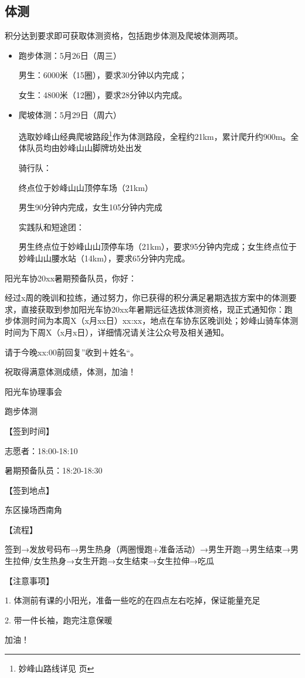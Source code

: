 \documentclass{ctexbook}
\begin{document}
\subsection{体测}

积分达到要求即可获取体测资格，包括跑步体测及爬坡体测两项。
\begin{itemize}

\item 跑步体测：5月26日（周三）

男生：6000米（15圈），要求30分钟以内完成；

女生：4800米（12圈），要求28分钟以内完成。

\item 爬坡体测：5月29日（周六）

选取妙峰山经典爬坡路段\footnote{妙峰山路线详见 \pageref{subsec:妙峰山} 页}作为体测路段，全程约21km，累计爬升约900m。全体队员均由妙峰山山脚牌坊处出发

骑行队：

终点位于妙峰山山顶停车场（21km）

男生90分钟内完成，女生105分钟内完成

实践队和短途团：

男生终点位于妙峰山山顶停车场（21km），要求95分钟内完成；女生终点位于妙峰山山腰水站（14km），要求65分钟内完成。

\end{itemize}
\begin{tcolorbox}[title=暑期跑步体测短信模板]
    
阳光车协20xx暑期预备队员，你好：

经过x周的晚训和拉练，通过努力，你已获得的积分满足暑期选拔方案中的体测要求，直接获取到参加阳光车协20xx年暑期远征选拔体测资格，现正式通知你：跑步体测时间为本周X（x月xx日）xx:xx，地点在车协东区晚训处；妙峰山骑车体测时间为下周X（x月x日），详细情况请关注公众号及相关通知。

请于今晚xx:00前回复''收到＋姓名``。

祝取得满意体测成绩，体测，加油！

阳光车协理事会
\end{tcolorbox}
\begin{tcolorbox}

跑步体测

【签到时间】

志愿者：18:00-18:10

暑期预备队员：18:20-18:30

【签到地点】

东区操场西南角

【流程】

签到→发放号码布→男生热身（两圈慢跑+准备活动）→男生开跑→男生结束→男生拉伸/女生热身→女生开跑→女生结束→女生拉伸→吃瓜

【注意事项】

1. 体测前有课的小阳光，准备一些吃的在四点左右吃掉，保证能量充足

2. 带一件长袖，跑完注意保暖

加油！
\end{tcolorbox}
\end{document}

